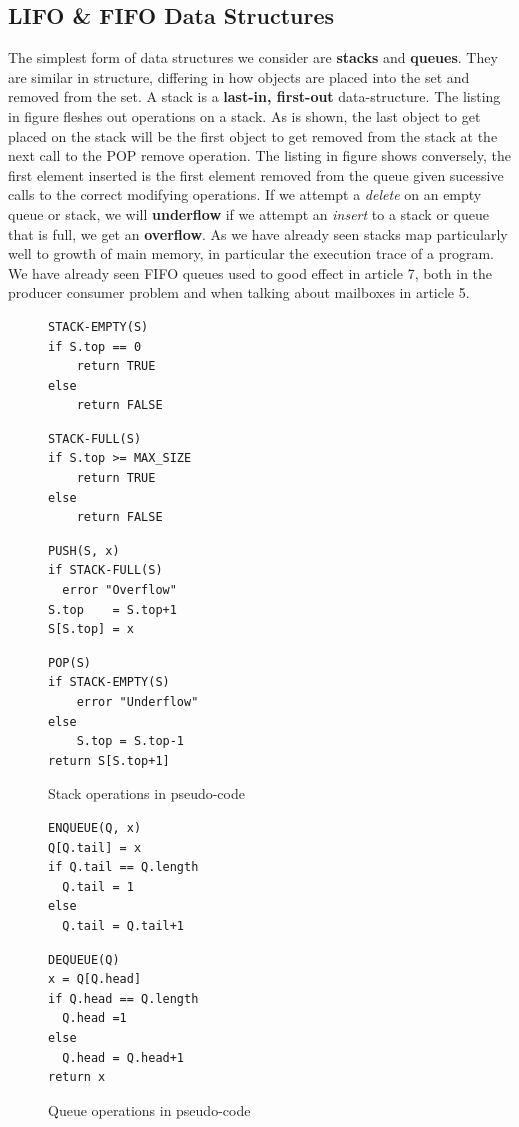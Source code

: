 \documentclass[10pt,a4paper]{article}
\begin{document}
\subsection{LIFO & FIFO Data Structures}
The simplest form of data structures we consider are {\bf stacks} and {\bf queues}. They are similar in structure, differing in how objects are placed into the set and removed from the set. A stack is a {\bf last-in, first-out} data-structure. The listing in figure \cite{stack} fleshes out operations on a stack. As is shown, the last object to get placed on the stack will be the first object to get removed from the stack at the next call to the POP remove operation. The listing in figure \cite{queue} shows conversely, the first element inserted is the first element removed from the queue given sucessive calls to the correct modifying operations. If we attempt a {\it delete} on an empty queue or stack, we will {\bf underflow} if we attempt an {\it insert} to a stack or queue that is full, we get an {\bf overflow}. As we have already seen stacks map particularly well to growth of main memory, in particular the execution trace of a program. We have already seen FIFO queues used to good effect in article 7, both in the producer consumer problem and when talking about mailboxes in article 5.
\begin{figure}
\caption{Stack operations in pseudo-code}
\begin{center}
\begin{lstlisting}
STACK-EMPTY(S)
if S.top == 0
    return TRUE
else  
    return FALSE
\end{lstlisting}
\begin{lstlisting}
STACK-FULL(S)
if S.top >= MAX_SIZE
    return TRUE
else  
    return FALSE
\end{lstlisting}
\begin{lstlisting}
PUSH(S, x)
if STACK-FULL(S)
  error "Overflow"
S.top    = S.top+1
S[S.top] = x	
\end{lstlisting}
\begin{lstlisting}
POP(S)
if STACK-EMPTY(S)
    error "Underflow"
else  
    S.top = S.top-1
return S[S.top+1]
\end{lstlisting}
\label{stack}
\end{center}
\end{figure}
\begin{figure}
\caption{Queue operations in pseudo-code}
\begin{center}
\begin{lstlisting}
ENQUEUE(Q, x)
Q[Q.tail] = x
if Q.tail == Q.length
  Q.tail = 1
else
  Q.tail = Q.tail+1
\end{lstlisting}
\begin{lstlisting}
DEQUEUE(Q)
x = Q[Q.head]
if Q.head == Q.length
  Q.head =1
else
  Q.head = Q.head+1
return x
\end{lstlisting}
\label{queue}
\end{center}
\end{figure}
\end{document}
